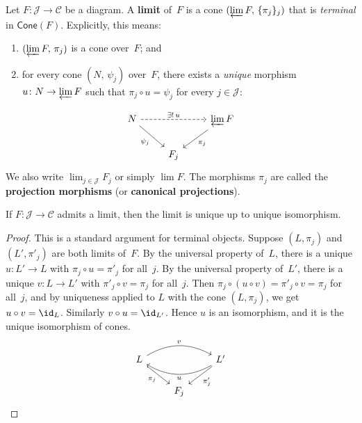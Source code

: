\begin{definition}[Limit]\label{def:limit}
Let $F\colon\mathcal{J}\to\mathcal{C}$ be a diagram.
A \textbf{limit} of~$F$ is a cone $(\varprojlim F,\,\{\pi_j\}_{j})$
that is \emph{terminal} in $\mathsf{Cone}(F)$.
Explicitly, this means:
\begin{enumerate}[label=(\alph*)]
\item $(\varprojlim F,\,\pi_j)$ is a cone over~$F$; and
\item for every cone $(N,\,\psi_j)$ over~$F$, there exists a
      \emph{unique} morphism $u\colon N\to\varprojlim F$
      such that $\pi_j\circ u = \psi_j$ for every $j\in\mathcal{J}$:
\end{enumerate}
\[
\begin{tikzcd}
N \arrow[dr, "\psi_j"'] \arrow[rr, dashed, "\exists!\, u"] & & \varprojlim F \arrow[dl, "\pi_j"] \\
& F_j &
\end{tikzcd}
\]
We also write $\lim_{j\in\mathcal{J}} F_j$ or simply $\lim F$.
The morphisms $\pi_j$ are called the \textbf{projection morphisms}
(or \textbf{canonical projections}).
\end{definition}

\begin{proposition}\label{prop:limit-unique}
If $F\colon\mathcal{J}\to\mathcal{C}$ admits a limit, then the limit
is unique up to unique isomorphism.
\end{proposition}

\begin{proof}
This is a standard argument for terminal objects.
Suppose $(L,\pi_j)$ and $(L',\pi'_j)$ are both limits of~$F$.
By the universal property of~$L$, there is a unique
$u\colon L'\to L$ with $\pi_j\circ u = \pi'_j$ for all~$j$.
By the universal property of~$L'$, there is a unique
$v\colon L\to L'$ with $\pi'_j\circ v = \pi_j$ for all~$j$.
Then $\pi_j\circ(u\circ v) = \pi'_j\circ v = \pi_j$
for all~$j$, and by uniqueness applied to $L$ with the cone $(L,\pi_j)$,
we get $u\circ v = \id_L$.  Similarly $v\circ u = \id_{L'}$.
Hence $u$ is an isomorphism, and it is the unique isomorphism of cones.
\[
\begin{tikzcd}
L \arrow[rr, bend left, "v"] & & L' \arrow[ll, bend left, "u"] \\
& F_j \arrow[ul, leftarrow, "\pi_j"] \arrow[ur, leftarrow, "\pi'_j"'] &
\end{tikzcd}
\]
\end{proof}


